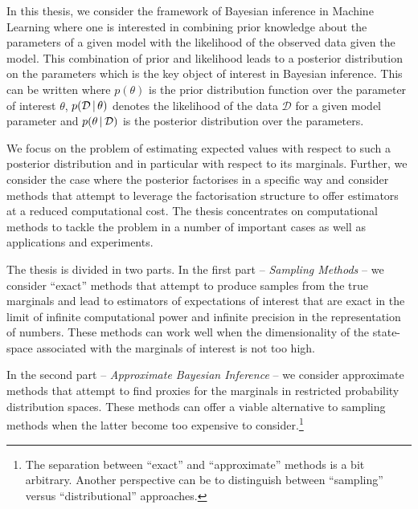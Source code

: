 
In this thesis, we consider the framework of Bayesian inference in Machine Learning where one is interested in combining prior knowledge about the parameters of a given model with the likelihood of the observed data given the model. 
This combination of prior and likelihood leads to a posterior distribution on the parameters which is the key object of interest in Bayesian inference. This can be written
where $p(\theta)$ is the prior distribution function over the parameter of interest $\theta$, $p(\mathcal D\,|\, \theta)$ denotes the likelihood of the data $\mathcal D$ for a given model parameter and $p(\theta\,|\, \mathcal D)$ is the posterior distribution over the parameters. 

We focus on the problem of estimating expected values with respect to such a posterior distribution and in particular with respect to its marginals. 
Further, we consider the case where the posterior factorises in a specific way and consider methods that attempt to leverage the factorisation structure to offer estimators at a reduced computational cost. 
The thesis concentrates on computational methods to tackle the problem in a number of important cases as well as applications and experiments. 

The thesis is divided in two parts. In the first part -- \emph{Sampling Methods} -- we consider ``exact'' methods that attempt to produce samples from the true marginals and lead to estimators of expectations of interest that are exact in the limit of infinite computational power and infinite precision in the representation of numbers. These methods can work well when the dimensionality of the state-space associated with the marginals of interest is not too high. 

In the second part -- \emph{Approximate Bayesian Inference} -- we consider approximate methods that attempt to find proxies for the marginals in restricted probability distribution spaces. These methods can offer a viable alternative to sampling methods when the latter become too expensive to consider.\footnote{The separation between ``exact'' and ``approximate'' methods is a bit arbitrary. Another perspective can be to distinguish between ``sampling'' versus ``distributional'' approaches.}

